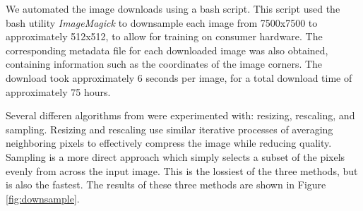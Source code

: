 \documentclass[10pt]{article}
\begin{document}


We automated the image downloads using a bash script. This script used the
bash utility \emph{ImageMagick} to downsample each image from 7500x7500 to 
approximately 512x512, to allow for training on consumer hardware. The
corresponding metadata file for each downloaded image was also obtained,
containing information such as the coordinates of the image corners. The download
took approximately 6 seconds per image, for a total download time of approximately
75 hours.


Several differen algorithms from were experimented with: resizing,
rescaling, and sampling. Resizing and rescaling use similar  iterative processes of
averaging neighboring pixels to effectively compress the image while reducing quality.
Sampling is a more direct approach which simply selects a subset of the pixels
evenly from across the input image. This is the lossiest of the three methods,
but is also the fastest. The results of these three methods are shown in 
Figure \ref{fig:downsample}.
\end{document}
